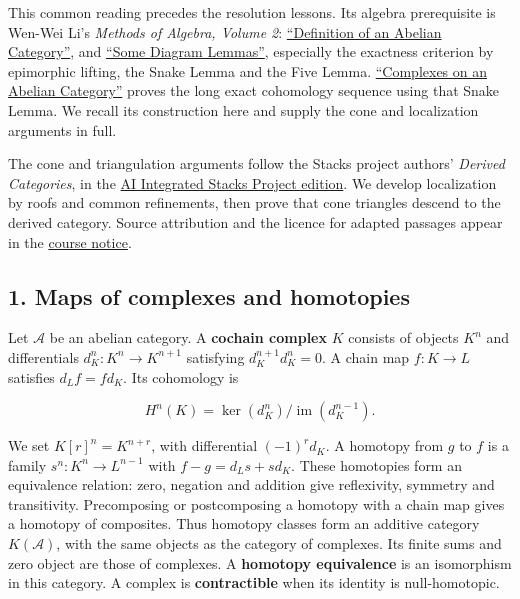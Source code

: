 \documentclass[
  english,
  11pt,
  a4paper,
]{article}
\begin{document}
This common reading precedes the resolution lessons. Its algebra
prerequisite is Wen-Wei Li's \emph{Methods of Algebra, Volume 2}:
\href{https://kokunoyumeto.github.io/methods-of-algebra-volume-2-en/\#unit-chapter2-unit-021}{``Definition
of an Abelian Category''}, and
\href{https://kokunoyumeto.github.io/methods-of-algebra-volume-2-en/\#unit-chapter2-unit-023}{``Some
Diagram Lemmas''}, especially the exactness criterion by epimorphic
lifting, the Snake Lemma and the Five Lemma.
\href{https://kokunoyumeto.github.io/methods-of-algebra-volume-2-en/\#unit-chapter3-unit-037}{``Complexes
on an Abelian Category''} proves the long exact cohomology sequence
using that Snake Lemma. We recall its construction here and supply the
cone and localization arguments in full.

The cone and triangulation arguments follow the Stacks project authors'
\emph{Derived Categories}, in the
\href{https://github.com/KokunoYumeto/unofficial-stacks-project-ai-drafts/blob/565b10e987aba5969b21145a0833f42d69f96790/derived.tex}{AI
Integrated Stacks Project edition}. We develop localization by roofs and
common refinements, then prove that cone triangles descend to the
derived category. Source attribution and the licence for adapted
passages appear in the \hyperref[sources-and-authorship]{course notice}.

\subsection{1. Maps of complexes and
homotopies}\label{complexes-cones-and-localization--1-maps-of-complexes-and-homotopies}

Let \(\mathcal A\) be an abelian category. A \textbf{cochain complex}
\(K\) consists of objects \(K^n\) and differentials
\(d_K^n:K^n\to K^{n+1}\) satisfying \(d_K^{n+1}d_K^n=0\). A chain map
\(f:K\to L\) satisfies \(d_Lf=fd_K\). Its cohomology is

\[H^n(K)=\ker(d_K^n)/\operatorname{im}(d_K^{n-1}).\]

We set \(K[r]^n=K^{n+r}\), with differential \((-1)^r d_K\). A homotopy
from \(g\) to \(f\) is a family \(s^n:K^n\to L^{n-1}\) with
\(f-g=d_Ls+sd_K\). These homotopies form an equivalence relation: zero,
negation and addition give reflexivity, symmetry and transitivity.
Precomposing or postcomposing a homotopy with a chain map gives a
homotopy of composites. Thus homotopy classes form an additive category
\(K(\mathcal A)\), with the same objects as the category of complexes.
Its finite sums and zero object are those of complexes. A
\textbf{homotopy equivalence} is an isomorphism in this category. A
complex is \textbf{contractible} when its identity is null-homotopic.
\end{document}
